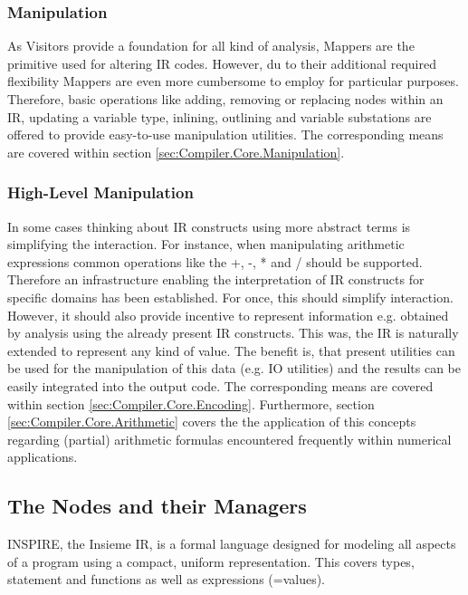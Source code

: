\subsubsection{Manipulation}
As Visitors provide a foundation for all kind of analysis, Mappers are the
primitive used for altering IR codes. However, du to their additional required
flexibility Mappers are even more cumbersome to employ for particular purposes.
Therefore, basic operations like adding, removing or replacing nodes within an
IR, updating a variable type, inlining, outlining and variable substations are
offered to provide easy-to-use manipulation utilities. The corresponding means
are covered within section \ref{sec:Compiler.Core.Manipulation}.

\subsubsection{High-Level Manipulation}
In some cases thinking about IR constructs using more abstract terms is
simplifying the interaction. For instance, when manipulating arithmetic
expressions common operations like the +, -, * and / should be supported.
Therefore an infrastructure enabling the interpretation of IR constructs for
specific domains has been established. For once, this should simplify
interaction. However, it should also provide incentive to represent information
e.g. obtained by analysis using the already present IR constructs. This was, the
IR is naturally extended to represent any kind of value. The benefit is, that
present utilities can be used for the manipulation of this data (e.g. IO
utilities) and the results can be easily integrated into the output code. The
corresponding means are covered within section \ref{sec:Compiler.Core.Encoding}.
Furthermore, section \ref{sec:Compiler.Core.Arithmetic} covers the the
application of this concepts regarding (partial) arithmetic formulas
encountered frequently within numerical applications.





\subsection{The Nodes and their Managers}
\label{sec:Compiler.Core.NodesAndManagers}
INSPIRE, the Insieme IR, is a formal language designed for modeling all aspects
of a program using a compact, uniform representation. This covers types,
statement and functions as well as expressions (=values).

